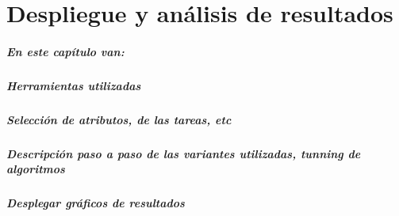 \chapter{Despliegue y an\'alisis de resultados}\label{resultados}

\paragraph{En este cap\'itulo van:}
\paragraph{Herramientas utilizadas}
\paragraph{Selecci\'on de atributos, de las tareas, etc}
\paragraph{Descripci\'on paso a paso de las variantes utilizadas, tunning de algoritmos}
\paragraph{Desplegar gr\'aficos de resultados}